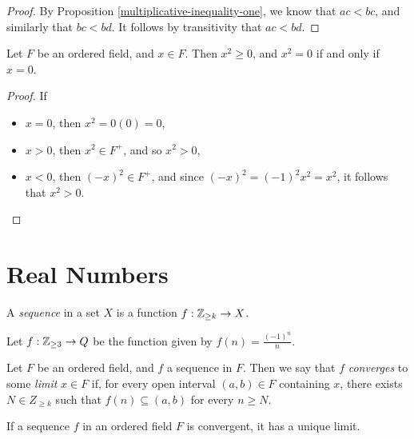 \begin{proof}
    By Proposition \ref{multiplicative-inequality-one}, we know that $ac < bc$, and similarly that $bc < bd$. It follows by transitivity that $ac < bd$.
\end{proof}

\begin{prop}\label{square-is-positive-or-zero}
    Let $F$ be an ordered field, and $x \in F$. Then $x^2 \geq 0$, and $x^2 = 0$ if and only if $x = 0$.
\end{prop}

\begin{proof}
    If
    \begin{itemize}
        \item $x = 0$, then $x^2 = 0(0) = 0$,
        \item $x > 0$, then $x^2 \in F^+$, and so $x^2 > 0$,
        \item $x < 0$, then $(-x)^2 \in F^+$, and since $(-x)^2 = (-1)^2x^2 = x^2$, it follows that $x^2 > 0$.
    \end{itemize}
\end{proof}

\section{Real Numbers}

\begin{defn}
    A \emph{sequence} in a set $X$ is a function $f: \mathbb{Z}_{\geq k} \to X$.
\end{defn}

\begin{exmp}
    Let $f: \mathbb{Z}_{\geq 3} \to Q$ be the function given by $f(n) = \frac{(-1)^n}{n}$.
\end{exmp}

\begin{defn}
    Let $F$ be an ordered field, and $f$ a sequence in $F$. Then we say that $f$ \emph{converges} to some \emph{limit} $x \in F$ if, for every open interval $(a, b) \in F$ containing $x$, there exists $N \in Z_{\geq k}$ such that $f(n) \subseteq (a, b)$ for every $n \geq N$.
\end{defn}

\begin{thm}
    If a sequence $f$ in an ordered field $F$ is convergent, it has a unique limit.
\end{thm}


